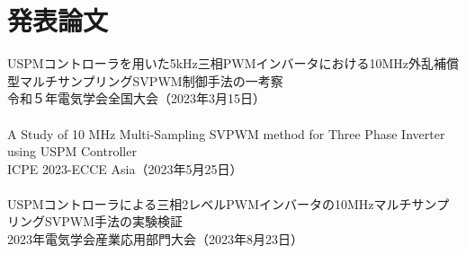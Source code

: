 
\chapter{発表論文}
USPMコントローラを用いた5kHz三相PWMインバータにおける10MHz外乱補償型マルチサンプリングSVPWM制御手法の一考察
\\
令和５年電気学会全国大会（2023年3月15日）
\\\\
A Study of 10 MHz Multi-Sampling SVPWM method for Three Phase Inverter using USPM Controller
\\
ICPE 2023-ECCE Asia（2023年5月25日）
\\\\
USPMコントローラによる三相2レベルPWMインバータの10MHzマルチサンプリングSVPWM手法の実験検証
\\
2023年電気学会産業応用部門大会（2023年8月23日）


\label{chap:first}

